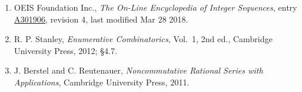 \documentclass[11pt]{article}
\theoremstyle{definition}
\begin{document}
\begin{enumerate}

\item OEIS Foundation Inc., \emph{The On-Line Encyclopedia of Integer Sequences}, entry \href{https://oeis.org/A301906}{A301906}, revision 4, last modified Mar 28 2018.

\item R. P. Stanley, \emph{Enumerative Combinatorics}, Vol.~1, 2nd ed., Cambridge University Press, 2012; \S4.7.

\item J. Berstel and C. Reutenauer, \emph{Noncommutative Rational Series with Applications}, Cambridge University Press, 2011.

\end{enumerate}
\end{document}
